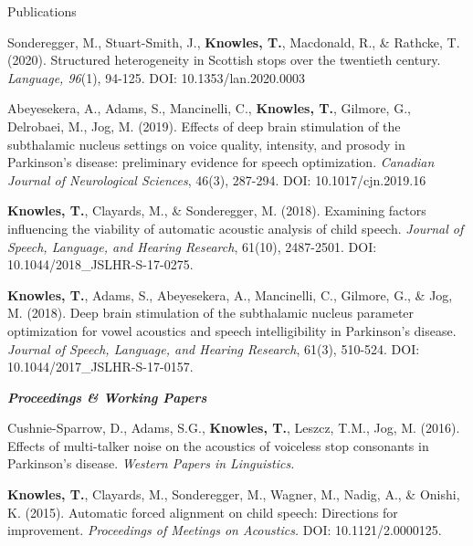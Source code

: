 \documentclass{resume} %
\begin{document}
\begin{rSection}{Publications}
\begin{etaremune}
	\item Sonderegger, M., Stuart-Smith, J., {\bf Knowles, T.}, Macdonald, R., \& Rathcke, T. (2020). Structured heterogeneity in Scottish stops over the twentieth century. \emph{Language, 96}(1), 94-125. DOI: 10.1353/lan.2020.0003
	
	\item Abeyesekera, A., Adams, S., Mancinelli, C., {\bf Knowles, T.}, Gilmore, G., Delrobaei, M., Jog, M. (2019).  Effects of deep brain stimulation of the subthalamic nucleus settings on voice quality, intensity, and prosody in Parkinson’s disease: preliminary evidence for speech optimization. \emph{Canadian Journal of Neurological Sciences}, 46(3), 287-294. DOI: 10.1017/cjn.2019.16	

	\item {\bf Knowles, T.}, Clayards, M., \& Sonderegger, M. (2018). Examining factors influencing the viability of automatic acoustic analysis of child speech. \emph{Journal of Speech, Language, and Hearing Research}, 61(10), 2487-2501. DOI: 10.1044/2018\_JSLHR-S-17-0275.

	\item {\bf Knowles, T.}, Adams, S., Abeyesekera, A., Mancinelli, C., Gilmore, G., \& Jog, M. (2018). Deep brain stimulation of the subthalamic nucleus parameter optimization for vowel acoustics and speech intelligibility in Parkinson's disease. \emph{Journal of Speech, Language, and Hearing Research}, 61(3), 510-524. DOI: 10.1044/2017\_JSLHR-S-17-0157.

\end{etaremune}

\begin{center}
	{\bf \emph{Proceedings \& Working Papers}}
\end{center}

\begin{etaremune}

	\item Cushnie-Sparrow, D., Adams, S.G., {\bf Knowles, T.}, Leszcz, T.M., Jog, M. (2016). Effects of multi-talker noise on the acoustics of voiceless stop consonants in Parkinson's disease. \emph{Western Papers in Linguistics.}

	\item {\bf Knowles, T.}, Clayards, M., Sonderegger, M., Wagner, M., Nadig, A., \& Onishi, K. (2015). Automatic forced alignment on child speech: Directions for improvement. \emph{Proceedings of Meetings on Acoustics.} DOI: 10.1121/2.0000125.


\end{etaremune}
\end{rSection}
\end{document}
